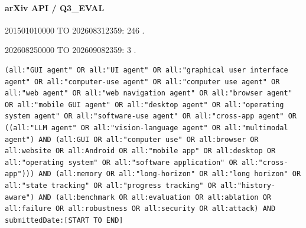 \noindent\begin{minipage}{\linewidth}
\paragraph{arXiv API / Q3\_EVAL}
\par 201501010000 TO 202608312359: 246 .
\par 202608250000 TO 202609082359: 3 .
\begin{lstlisting}
(all:"GUI agent" OR all:"UI agent" OR all:"graphical user interface agent" OR all:"computer-use agent" OR all:"computer use agent" OR all:"web agent" OR all:"web navigation agent" OR all:"browser agent" OR all:"mobile GUI agent" OR all:"desktop agent" OR all:"operating system agent" OR all:"software-use agent" OR all:"cross-app agent" OR ((all:"LLM agent" OR all:"vision-language agent" OR all:"multimodal agent") AND (all:GUI OR all:"computer use" OR all:browser OR all:website OR all:Android OR all:"mobile app" OR all:desktop OR all:"operating system" OR all:"software application" OR all:"cross-app"))) AND (all:memory OR all:"long-horizon" OR all:"long horizon" OR all:"state tracking" OR all:"progress tracking" OR all:"history-aware") AND (all:benchmark OR all:evaluation OR all:ablation OR all:failure OR all:robustness OR all:security OR all:attack) AND submittedDate:[START TO END]
\end{lstlisting}
\end{minipage}\par\medskip
\paragraph{}
\paragraph{}
